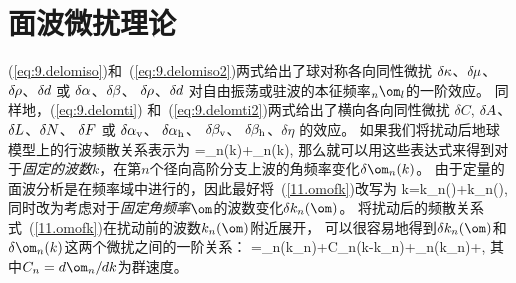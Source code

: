 \section{面波微扰理论}
%
%
\label{11.sec.cpert}

(\ref{eq:9.delomiso})和~(\ref{eq:9.delomiso2})两式给出了球对称各向同性微扰
$\delta\hspace{-0.1 mm}\kappa$、$\delta\hspace{-0.2 mm}\mu$、
$\delta\hspace{-0.2 mm}\rho$、$\delta\hspace{-0.1 mm}d$ 
或
$\delta\hspace{-0.1 mm}\alpha$、$\delta\hspace{-0.2 mm}\beta$、
$\delta\hspace{-0.2 mm}\rho$、$\delta\hspace{-0.1 mm}d$ 
对自由振荡或驻波的本征频率${}_n\om_l$的一阶效应。
同样地，(\ref{eq:9.delomti}) 和~(\ref{eq:9.delomti2})两式给出了横向各向同性微扰
$\delta C$, $\delta\hspace{-0.2 mm}A$、
$\delta\hspace{-0.1 mm}L$、$\delta\hspace{-0.1 mm}N$、
$\delta\hspace{-0.1 mm}F$ 
或
$\delta\hspace{-0.1 mm}\alpha_{\rm v}$、
$\delta\hspace{-0.1 mm}\alpha_{\rm h}$、
$\delta\hspace{-0.2 mm}\beta_{\rm v}$、
$\delta\hspace{-0.2 mm}\beta_{\rm h}$、$\delta\eta$
的效应。
如果我们将扰动后地球模型上的行波频散关系表示为
\eq \label{11.omofk}
\om=\om_n(k)+\delta\om_n(k),
\en
那么就可以用这些表达式来得到对于{\em 固定的波数\/}$k$，在第$n$个径向高阶分支上波的角频率变化$\delta\om_n(k)$。
由于定量的面波分析是在频率域中进行的，因此最好将~(\ref{11.omofk})改写为
\eq \label{11.kofom}
k=k_n(\om)+\delta k_n(\om),
\en
同时改为考虑对于{\em 固定角频率\/}$\om$的波数变化$\delta k_n(\om)$。
将扰动后的频散关系式~(\ref{11.omofk})在扰动前的波数$k_n(\om)$附近展开，
可以很容易地得到$\delta k_n(\om)$和$\delta\om_n(k)$这两个微扰之间的一阶关系：
\eq \label{11.omofk2}
\om=\om_n(k_n)+C_n(k-k_n)+\delta\om_n(k_n)+\cdots,
\en
其中$C_n=d\om_n/\hspace{-0.2 mm}dk$为群速度。
